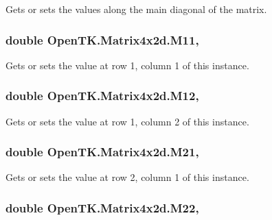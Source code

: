 Gets or sets the values along the main diagonal of the matrix. 

\hypertarget{struct_open_t_k_1_1_matrix4x2d_aff61b5a2a7217269005d2273ba315f32}{
\subsubsection[{M11}]{\setlength{\rightskip}{0pt plus 5cm}double Open\-T\-K.\-Matrix4x2d.\-M11\hspace{0.3cm}{\ttfamily [get]}, {\ttfamily [set]}}}\label{struct_open_t_k_1_1_matrix4x2d_aff61b5a2a7217269005d2273ba315f32}


Gets or sets the value at row 1, column 1 of this instance. 

\hypertarget{struct_open_t_k_1_1_matrix4x2d_a69594dd44138f0a1df02d1f7c55254d6}{
\subsubsection[{M12}]{\setlength{\rightskip}{0pt plus 5cm}double Open\-T\-K.\-Matrix4x2d.\-M12\hspace{0.3cm}{\ttfamily [get]}, {\ttfamily [set]}}}\label{struct_open_t_k_1_1_matrix4x2d_a69594dd44138f0a1df02d1f7c55254d6}


Gets or sets the value at row 1, column 2 of this instance. 

\hypertarget{struct_open_t_k_1_1_matrix4x2d_af97acd326d522e5ec3b081b979a45cd2}{
\subsubsection[{M21}]{\setlength{\rightskip}{0pt plus 5cm}double Open\-T\-K.\-Matrix4x2d.\-M21\hspace{0.3cm}{\ttfamily [get]}, {\ttfamily [set]}}}\label{struct_open_t_k_1_1_matrix4x2d_af97acd326d522e5ec3b081b979a45cd2}


Gets or sets the value at row 2, column 1 of this instance. 

\hypertarget{struct_open_t_k_1_1_matrix4x2d_aa8605507229324d9986d025e09c14d8f}{
\subsubsection[{M22}]{\setlength{\rightskip}{0pt plus 5cm}double Open\-T\-K.\-Matrix4x2d.\-M22\hspace{0.3cm}{\ttfamily [get]}, {\ttfamily [set]}}}\label{struct_open_t_k_1_1_matrix4x2d_aa8605507229324d9986d025e09c14d8f}


